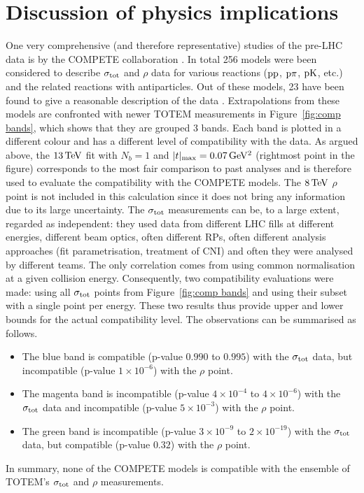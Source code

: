 \section{Discussion of physics implications}
\label{sec:discussion}

One very comprehensive (and therefore representative) studies of the pre-LHC data is by the COMPETE collaboration \cite{compete}. In total 256 models were been considered to describe $\sigma_{\rm tot}$ and $\rho$ data for various reactions ($\rm pp$, $\rm p\pi$, $\rm pK$, etc.) and the related reactions with antiparticles. Out of these models, 23 have been found to give a reasonable description of the data \cite{compete-details}. Extrapolations from these models are confronted with newer TOTEM measurements in Figure~\ref{fig:comp bands}, which shows that they are grouped 3 bands. Each band is plotted in a different colour and has a different level of compatibility with the data. As argued above, the $13\,{\rm TeV}$ fit with $N_b=1$ and $|t|_{\rm max} = 0.07\,{\rm GeV^2}$ (rightmost point in the figure) corresponds to the most fair comparison to past analyses and is therefore used to evaluate the compatibility with the COMPETE models. The $8\,{\rm TeV}$ $\rho$ point is not included in this calculation since it does not bring any information due to its large uncertainty. The $\sigma_{\rm tot}$ measurements can be, to a large extent, regarded as independent: they used data from different LHC fills at different energies, different beam optics, often different RPs, often different analysis approaches (fit parametrisation, treatment of CNI) and often they were analysed by different teams. The only correlation comes from using common normalisation at a given collision energy. Consequently, two compatibility evaluations were made: using all $\sigma_{\rm tot}$ points from Figure~\ref{fig:comp bands} and using their subset with a single point per energy. These two results thus provide upper and lower bounds for the actual compatibility level. The observations can be summarised as follows.
\begin{itemize}[noitemsep,topsep=0pt]
\item The blue band is compatible (p-value $0.990$ to $0.995$) with the $\sigma_{\rm tot}$ data, but incompatible (p-value $1\times10^{-6}$) with the $\rho$ point.
\item The magenta band is incompatible (p-value $4\times10^{-4}$ to $4\times10^{-6}$) with the $\sigma_{\rm tot}$ data and incompatible (p-value $5\times10^{-3}$) with the $\rho$ point.
\item The green band is incompatible (p-value $3\times10^{-9}$ to $2\times10^{-19}$) with the $\sigma_{\rm tot}$ data, but compatible (p-value $0.32$) with the $\rho$ point.
\end{itemize}
In summary, none of the COMPETE models is compatible with the ensemble of TOTEM's $\sigma_{\rm tot}$ and $\rho$ measurements.

